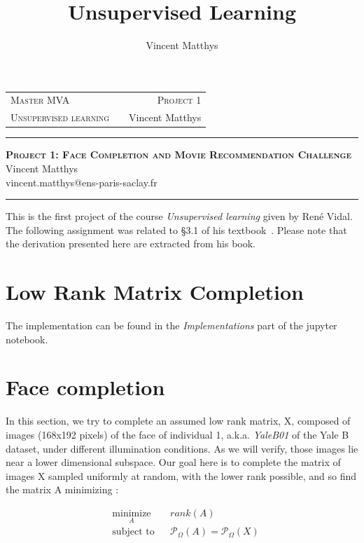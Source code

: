 \documentclass[12pt,a4paper,onecolumn]{article}
\title{Unsupervised Learning}
\author{Vincent Matthys}
\begin{document}
\begin{tabularx}{0.8\textwidth}{@{} l X r @{} }
	{\textsc{Master MVA}}          &  & \textsc{Project 1} \\
	\textsc{Unsupervised learning} &  & {Vincent Matthys}  \\
\end{tabularx}
\vspace{1.5cm}
\begin{center}
	\rule[11pt]{5cm}{0.5pt}

	\textbf{\LARGE \textsc{Project 1: Face Completion and Movie Recommendation Challenge}}
	\vspace{0.5cm}\\
	Vincent Matthys\\
	vincent.matthys@ens-paris-saclay.fr\\
	\rule{5cm}{0.5pt}
	\vspace{1.5cm}
\end{center}

This is the first project of the course \textit{Unsupervised learning} given by René Vidal. The following assignment was related to \S 3.1 of his textbook~\cite{vidal2016principal}. Please note that the derivation presented here are extracted from his book.

\section{Low Rank Matrix Completion}

The implementation can be found in the \textit{Implementations} part of the jupyter notebook.

\section{Face completion}

In this section, we try to complete an assumed low rank matrix, X, composed of images (168x192 pixels) of the face of individual 1, a.k.a. \textit{YaleB01} of the Yale B dataset, under different illumination conditions. As we will verify, those images lie near a lower dimensional subspace. Our goal here is to complete the matrix of images X sampled uniformly at random, with the lower rank possible, and so find the matrix A minimizing :

\begin{equation}
	\begin{aligned}
		 & \underset{A}{\text{minimize}}
		 &                               & rank(A)                                           \\
		 & \text{subject to}
		 &                               & \mathcal{P}_{\Omega}(A) = \mathcal{P}_{\Omega}(X)
	\end{aligned}
	\label{eq_hard}
\end{equation}
\end{document}

